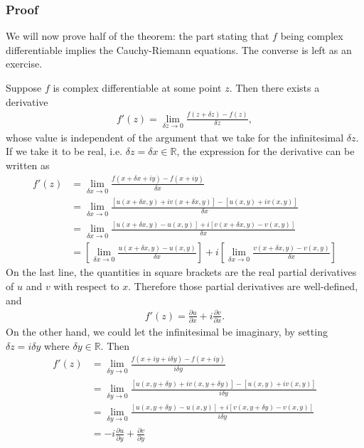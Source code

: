 \documentclass[10pt,a4paper]{article}
\begin{document}
\subsubsection{Proof}\label{proof}

We will now prove half of the theorem: the part stating that $f$ being
complex differentiable implies the Cauchy-Riemann equations.  The
converse is left as an exercise.

Suppose $f$ is complex differentiable at some point $z$.  Then there
exists a derivative
\begin{align}
  f'(z) = \lim_{\delta z \rightarrow 0} \frac{f(z+\delta z) - f(z)}{\delta z},
\end{align}
whose value is independent of the argument that we take for the
infinitesimal $\delta z$.  If we take it to be real, i.e. $\delta z =
\delta x \in \mathbb{R}$, the expression for the derivative can be
written as
\begin{align}
  f'(z) &= \lim_{\delta x \rightarrow 0} \frac{f(x+\delta x + i y) - f(x + i y)}{\delta x} \\
  &= \lim_{\delta x \rightarrow 0} \frac{\left[u(x+\delta x, y) + iv(x+\delta x, y)\right] - \left[u(x, y) + i v(x,y)\right]}{\delta x}\\
  &= \lim_{\delta x \rightarrow 0} \frac{\left[u(x+\delta x, y) - u(x,y)\right] + i \left[v(x+\delta x, y)-v(x,y)\right]}{\delta x} \\
  &= \left[ \lim_{\delta x \rightarrow 0} \frac{u(x+\delta x, y) - u(x,y)}{\delta x}\right] + i \left[ \lim_{\delta x \rightarrow 0} \frac{v(x+\delta x, y) - v(x,y)}{\delta x}\right]
\end{align}
On the last line, the quantities in square brackets are the real
partial derivatives of $u$ and $v$ with respect to $x$. Therefore
those partial derivatives are well-defined, and
\begin{align}
  f'(z) = \frac{\partial u}{\partial x} + i \frac{\partial v}{\partial x}.
\end{align}
On the other hand, we could let the infinitesimal be imaginary, by
setting $\delta z = i \delta y$ where $\delta y \in \mathbb{R}$.  Then
\begin{align}
  f'(z) &= \lim_{\delta y \rightarrow 0} \frac{f(x+ i y + i\delta y) - f(x + i y)}{i\delta y} \\
  &= \lim_{\delta y \rightarrow 0} \frac{\left[u(x, y+\delta y) + iv(x, y+\delta y)\right] - \left[u(x, y) + i v(x,y)\right]}{i\delta y}\\
  &= \lim_{\delta y \rightarrow 0} \frac{\left[u(x, y+\delta y) - u(x,y)\right] + i \left[v(x, y+\delta y)-v(x,y)\right]}{i\delta y} \\
  & = -i\frac{\partial u}{\partial y} + \frac{\partial v}{\partial y}
\end{align}
\end{document}

